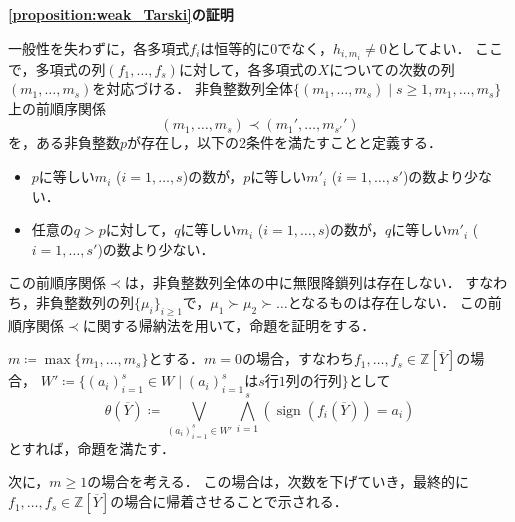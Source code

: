 \documentclass[uplatex, dvipdfmx]{jsarticle}
\makeatletter
\numberwithin{equation}{section}
\renewenvironment{proof}[1][\proofname]{\par
  \pushQED{\qed}%
  \normalfont \topsep6\p@\@plus6\p@\relax
  \trivlist
  \item\relax
  {\bfseries
  #1\@addpunct{.}}\hspace\labelsep\ignorespaces
}{
  \popQED\endtrivlist\@endpefalse
}
\newcommand{\Z}{\mathbb{Z}}
\DeclareMathOperator{\sign}{sign}
\theoremstyle{definition}
\renewcommand{\proofname}{\textbf{証明}}
\makeatother
\begin{document}
\begin{proof}[\cref{proposition:weak_Tarski}の証明]
     一般性を失わずに，各多項式$f_i$は恒等的に$0$でなく，$h_{i, m_i} \neq 0$としてよい．
     ここで，多項式の列$(f_1, \dots, f_s)$に対して，各多項式の$X$についての次数の列$(m_1, \dots, m_s)$を対応づける．
     非負整数列全体$\{(m_1, \dots, m_s) \mid s \geq 1, m_1, \dots, m_s\}$上の前順序関係
     \begin{equation}
          (m_1, \dots, m_s) \prec (m_1', \dots, m_{s'}')
     \end{equation}
     を，ある非負整数$p$が存在し，以下の2条件を満たすことと定義する．
     \begin{itemize}
          \item $p$に等しい$m_i$ ($i=1, \dots, s$)の数が，$p$に等しい$m'_i$ ($i=1, \dots, s'$)の数より少ない．
          \item 任意の$q>p$に対して，$q$に等しい$m_i$ ($i=1, \dots, s$)の数が，$q$に等しい$m'_i$ ($i=1, \dots, s'$)の数より少ない．
     \end{itemize}
     この前順序関係$\prec$は，非負整数列全体の中に無限降鎖列は存在しない．
     すなわち，非負整数列の列$\{\mu_i\}_{i \geq 1}$で，$\mu_1 \succ \mu_2 \succ \dots$となるものは存在しない．
     この前順序関係$\prec$に関する帰納法を用いて，命題を証明をする．

     $m\coloneqq \max\{m_1, \dots, m_s\}$とする．$m=0$の場合，すなわち$f_1, \dots, f_s \in \Z\left[\overline{Y}\right]$の場合，
     $W'\coloneqq\{(a_i)_{i=1}^s \in W \mid \text{$(a_i)_{i=1}^s$は$s$行$1$列の行列}\}$として
     \begin{equation}
          \theta\left(\overline{Y}\right) \coloneqq \bigvee_{(a_i)_{i=1}^s \in W'}\bigwedge_{i=1}^s \left(\sign\left(f_i\left(\overline{Y}\right)\right)=a_i\right)
     \end{equation}
     とすれば，命題を満たす．

     次に，$m \geq 1$の場合を考える．
     この場合は，次数を下げていき，最終的に$f_1, \dots, f_s \in \Z\left[\overline{Y}\right]$の場合に帰着させることで示される．


\end{proof}
\end{document}
